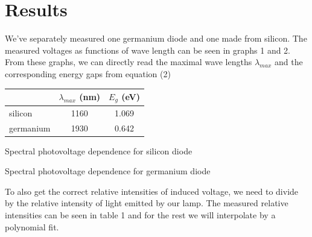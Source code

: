\documentclass[a4paper,11pt]{article}
\begin{document}
\section{Results}

We've separately measured one germanium diode and one made from silicon. The measured voltages as functions of wave length can be seen in graphs 1 and 2. From these graphs, we can directly read the maximal wave lengths $ \lambda_{max} $  and the corresponding energy gaps from equation (2)

\begin{table}[htpb]
    \centering
    \begin{tabular}{l c c}
        & $ \lambda_{max} $ (nm) & $ E_g $ (eV) \\ \hline
        silicon & 1160 & 1.069 \\
        germanium & 1930 &  0.642 \\ 
    \end{tabular}
\end{table}

 

\begin{table}[htpb]
    \begin{minipage}[b]{.45\linewidth}
        \centering
        \resizebox{\textwidth}{!}{  }
        \captionsetup{type=graph}
        \caption{Spectral photovoltage dependence for silicon diode}
    \end{minipage} 
    \hfill
    \begin{minipage}[b]{.45\linewidth}
        \centering
        \resizebox{\textwidth}{!}{  }
        \captionsetup{type=graph}
        \caption{Spectral photovoltage dependence for germanium diode}
    \end{minipage} 
\end{table}

To also get the correct relative intensities of induced voltage, we need to divide by the relative intensity of light emitted by our lamp. The measured relative intensities can be seen in table 1 and for the rest we will interpolate by a polynomial fit.
\end{document}
